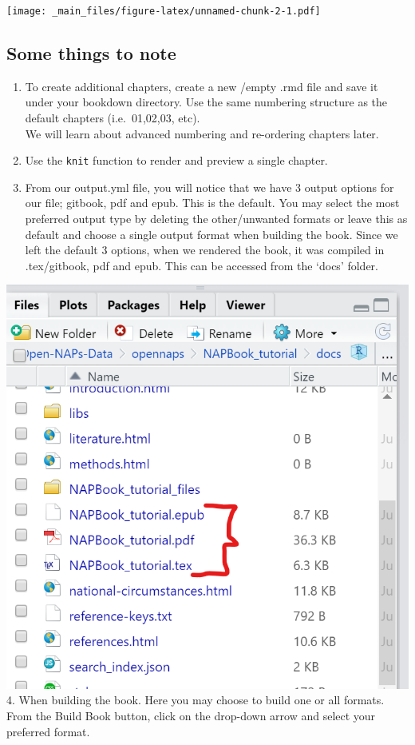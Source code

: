 \documentclass[
]{book}
\providecommand{\tightlist}{%
  \setlength{\itemsep}{0pt}\setlength{\parskip}{0pt}}
\begin{document}
\texttt{[image: \_main\_files/figure-latex/unnamed-chunk-2-1.pdf]}

\hypertarget{some-things-to-note}{%
\subsection{Some things to note}\label{some-things-to-note}}

\begin{enumerate}
\def\labelenumi{\arabic{enumi}.}
\tightlist
\item
  To create additional chapters, create a new /empty .rmd file and save it under your bookdown directory. Use the same numbering structure as the default chapters (i.e.~01,02,03, etc).\\
  We will learn about advanced numbering and re-ordering chapters later.\\
\item
  Use the \texttt{knit} function to render and preview a single chapter.\\
\item
  From our output.yml file, you will notice that we have 3 output options for our file; gitbook, pdf and epub. This is the default. You may select the most preferred output type by deleting the other/unwanted formats or leave this as default and choose a single output format when building the book. Since we left the default 3 options, when we rendered the book, it was compiled in .tex/gitbook, pdf and epub. This can be accessed from the `docs' folder.
\end{enumerate}

\includegraphics{tutorial_screenshots/docs_folder_contents.png}\\
4. When building the book. Here you may choose to build one or all formats. From the Build Book button, click on the drop-down arrow and select your preferred format.
\end{document}
